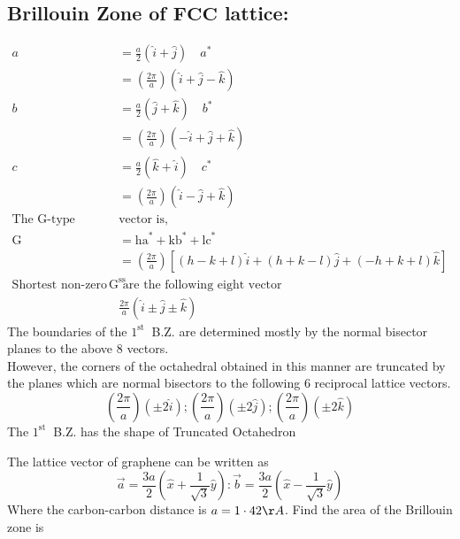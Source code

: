 \subsection{ Brillouin Zone of $\mathbf{F C C}$ lattice:}
\begin{align*}
a&=\frac{a}{2}(\hat{i}+\hat{j}) \quad a^{*}\\&=\left(\frac{2 \pi}{a}\right)(\hat{i}+\hat{j}-\hat{k})\\
b&=\frac{a}{2}(\hat{j}+\hat{k}) \quad b^{*}\\&=\left(\frac{2 \pi}{a}\right)(-\hat{i}+\hat{j}+\hat{k})\\
c&=\frac{a}{2}(\hat{k}+\hat{i}) \quad c^{*}\\&=\left(\frac{2 \pi}{a}\right)(\hat{i}-\hat{j}+\hat{k})\\
\text{The G-type }&\text{vector is,}\\
\mathrm{G}&=\mathrm{ha}^{*}+\mathrm{kb}^{*}+\mathrm{lc}^{*}\\&=
\left(\frac{2 \pi}{a}\right)[(h-k+l) \hat{i}+(h+k-l) \hat{j}+(-h+k+l) \hat{k}]\\
\text{Shortest non-zero $\mathrm{G}^{\mathrm{ss}}$}&\text{ are the following eight vector}\\
&\frac{2 \pi}{a}(\hat{i} \pm \hat{j} \pm \hat{k})
\end{align*}
The boundaries of the $1^{\text {st }}$ B.Z. are determined mostly by the normal bisector planes to the above 8 vectors.\\
However, the corners of the octahedral obtained in this manner are truncated by the planes which are normal bisectors to the following 6 reciprocal lattice vectors.
$$
\left(\frac{2 \pi}{a}\right)(\pm 2 \hat{i}) ;\left(\frac{2 \pi}{a}\right)(\pm 2 \hat{j}) ;\left(\frac{2 \pi}{a}\right)(\pm 2 \hat{k})
$$
The $1^{\text {st }}$ B.Z. has the shape of Truncated Octahedron 
\begin{exercise}
	The lattice vector of graphene can be written as
	$$
	\vec{a}=\frac{3 a}{2}\left(\hat{x}+\frac{1}{\sqrt{3}} \hat{y}\right): \vec{b}=\frac{3 a}{2}\left(\hat{x}-\frac{1}{\sqrt{3}} \hat{y}\right)
	$$
	Where the carbon-carbon distance is $a=1 \cdot 42 \AA$. Find the area of the Brillouin zone is
\end{exercise}

